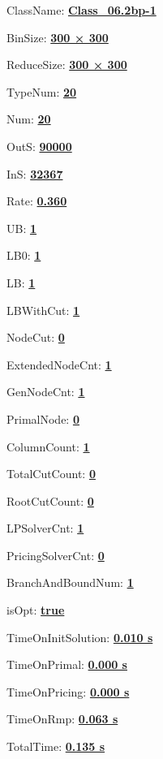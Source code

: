 \documentclass[11pt]{article}
\begin{document}
\pagestyle{empty}


ClassName: \underline{\textbf{Class_06.2bp-1}}
\par
BinSize: \underline{\textbf{300 × 300}}
\par
ReduceSize: \underline{\textbf{300 × 300}}
\par
TypeNum: \underline{\textbf{20}}
\par
Num: \underline{\textbf{20}}
\par
OutS: \underline{\textbf{90000}}
\par
InS: \underline{\textbf{32367}}
\par
Rate: \underline{\textbf{0.360}}
\par
UB: \underline{\textbf{1}}
\par
LB0: \underline{\textbf{1}}
\par
LB: \underline{\textbf{1}}
\par
LBWithCut: \underline{\textbf{1}}
\par
NodeCut: \underline{\textbf{0}}
\par
ExtendedNodeCnt: \underline{\textbf{1}}
\par
GenNodeCnt: \underline{\textbf{1}}
\par
PrimalNode: \underline{\textbf{0}}
\par
ColumnCount: \underline{\textbf{1}}
\par
TotalCutCount: \underline{\textbf{0}}
\par
RootCutCount: \underline{\textbf{0}}
\par
LPSolverCnt: \underline{\textbf{1}}
\par
PricingSolverCnt: \underline{\textbf{0}}
\par
BranchAndBoundNum: \underline{\textbf{1}}
\par
isOpt: \underline{\textbf{true}}
\par
TimeOnInitSolution: \underline{\textbf{0.010 s}}
\par
TimeOnPrimal: \underline{\textbf{0.000 s}}
\par
TimeOnPricing: \underline{\textbf{0.000 s}}
\par
TimeOnRmp: \underline{\textbf{0.063 s}}
\par
TotalTime: \underline{\textbf{0.135 s}}
\par
\newpage
\end{document}

